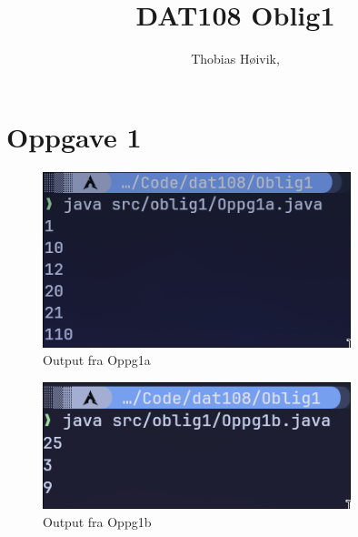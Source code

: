 
\usepackage{graphicx}   %
\usepackage{float}      %

\title{\huge{DAT108 Oblig1}}
\author{\LARGE{Thobias Høivik, }}
\date{}



\maketitle

\newpage
\tableofcontents

\newpage
\section{Oppgave 1}

\begin{figure}[H]   %
    \centering
    \includegraphics[width=0.8\textwidth]{./bilder/Oppg1a.png}
    \caption{Output fra Oppg1a}
\end{figure}

\begin{figure}[H]   %
    \centering
    \includegraphics[width=0.8\textwidth]{./bilder/Oppg1b.png}
    \caption{Output fra Oppg1b}
\end{figure}

\newpage 
